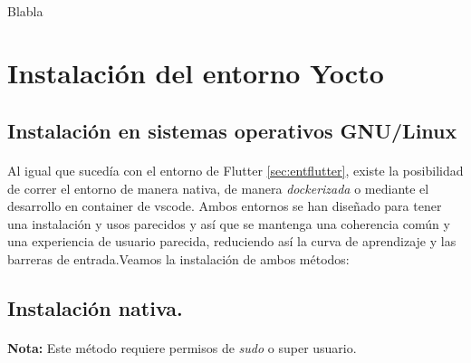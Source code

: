 \paragraph{}Blabla

\newpage

\section{Instalación del entorno Yocto}

\subsection{Instalación en sistemas operativos GNU/Linux}

\paragraph{}Al igual que sucedía con el entorno de Flutter \ref{sec:entflutter}, existe
la posibilidad de correr el entorno de manera nativa, de manera \emph{dockerizada} o
mediante el desarrollo en container de \gls{vscode}.
Ambos entornos se han diseñado para tener una instalación y usos parecidos y así que
se mantenga una coherencia común y una experiencia de usuario parecida, reduciendo así
la curva de aprendizaje y las barreras de entrada.Veamos la instalación de ambos métodos:

\subsection{Instalación nativa.}

\paragraph{}\textbf{Nota:} Este método requiere permisos de \emph{sudo} o super usuario.

